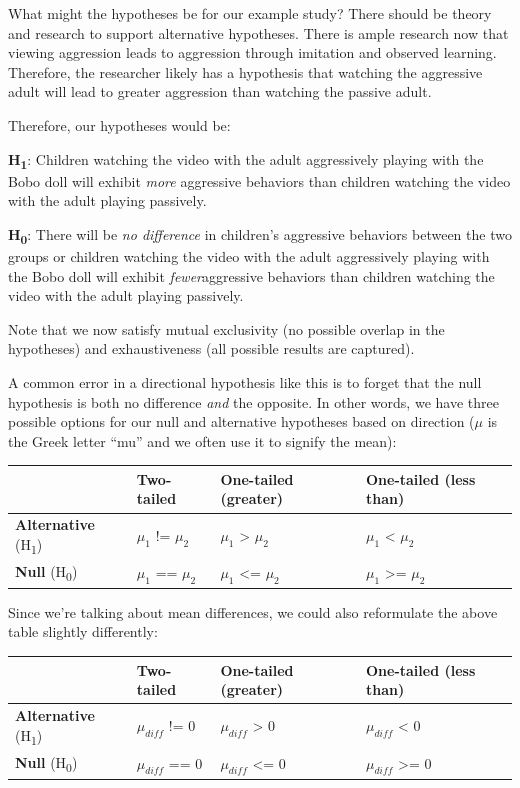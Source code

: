 \documentclass[
]{book}
\begin{document}
What might the hypotheses be for our example study? There should be theory and research to support alternative hypotheses. There is ample research now that viewing aggression leads to aggression through imitation and observed learning. Therefore, the researcher likely has a hypothesis that watching the aggressive adult will lead to greater aggression than watching the passive adult.

Therefore, our hypotheses would be:

\textbf{H\textsubscript{1}}: Children watching the video with the adult aggressively playing with the Bobo doll will exhibit \emph{more} aggressive behaviors than children watching the video with the adult playing passively.

\textbf{H\textsubscript{0}}: There will be \emph{no difference} in children's aggressive behaviors between the two groups or children watching the video with the adult aggressively playing with the Bobo doll will exhibit \emph{fewer}aggressive behaviors than children watching the video with the adult playing passively.

Note that we now satisfy mutual exclusivity (no possible overlap in the hypotheses) and exhaustiveness (all possible results are captured).

A common error in a directional hypothesis like this is to forget that the null hypothesis is both no difference \emph{and} the opposite. In other words, we have three possible options for our null and alternative hypotheses based on direction (\(\mu\) is the Greek letter ``mu'' and we often use it to signify the mean):

\begin{longtable}[]{@{}llll@{}}
\toprule
& Two-tailed & One-tailed (greater) & One-tailed (less than)\tabularnewline
\midrule
\endhead
\textbf{Alternative} (H\textsubscript{1}) & \(\mu_1\) != \(\mu_2\) & \(\mu_1\) \textgreater{} \(\mu_2\) & \(\mu_1\) \textless{} \(\mu_2\)\tabularnewline
\textbf{Null} (H\textsubscript{0}) & \(\mu_1\) == \(\mu_2\) & \(\mu_1\) \textless= \(\mu_2\) & \(\mu_1\) \textgreater= \(\mu_2\)\tabularnewline
\bottomrule
\end{longtable}

Since we're talking about mean differences, we could also reformulate the above table slightly differently:

\begin{longtable}[]{@{}llll@{}}
\toprule
& Two-tailed & One-tailed (greater) & One-tailed (less than)\tabularnewline
\midrule
\endhead
\textbf{Alternative} (H\textsubscript{1}) & \(\mu_{diff}\) != 0 & \(\mu_{diff}\) \textgreater{} 0 & \(\mu_{diff}\) \textless{} 0\tabularnewline
\textbf{Null} (H\textsubscript{0}) & \(\mu_{diff}\) == 0 & \(\mu_{diff}\) \textless= 0 & \(\mu_{diff}\) \textgreater= 0\tabularnewline
\bottomrule
\end{longtable}
\end{document}
